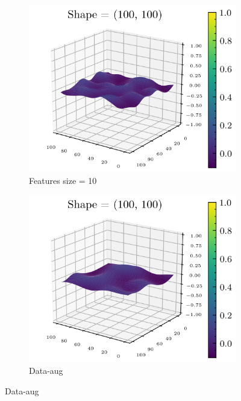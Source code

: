 \documentclass[../document.tex]{subfiles}
\begin{document}
\begin{figure}[H]
    \centering

        \begin{subfigure}[b]{0.45\textwidth}
            \includegraphics[width=\textwidth]{../img/data-aug/3d/simplex1.png}
            \caption{Features size = 10}
        \end{subfigure}
        \begin{subfigure}[b]{0.45\linewidth}
            \includegraphics[width=\textwidth]{../img/data-aug/3d/simplex2.png}
            \caption{Data-aug}
            \end{subfigure}    

\end{figure}
\end{document}

